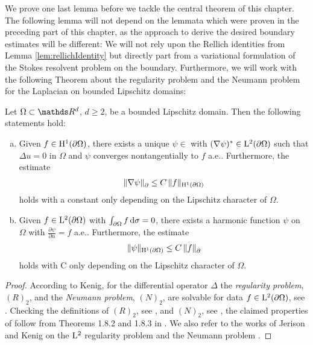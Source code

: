 We prove one last lemma before we tackle the central theorem of this chapter.
The following lemma will not depend on the lemmata which were proven in the preceding part of this chapter, as the approach to derive the desired boundary estimates will be different:
We will not rely upon the Rellich identities from Lemma \ref{lem:rellichIdentity} but directly part from a variational formulation of the Stokes resolvent problem on the boundary. 
Furthermore, we will work with the following Theorem about the regularity problem and the Neumann problem for the Laplacian on bounded Lipschitz domains:
\begin{thm}
  \label{thm:jerisonKenig}
  Let $\Omega \subset \R^d$, $d \geq 2$, be a bounded Lipschitz domain. Then the following statements hold:
  \begin{enumerate}[a)]
    \item Given $f \in \mathrm{H}^1(\partial\Omega)$, there exists a unique $\psi \in$ with $(\nabla \psi)^* \in \mathrm{L}^2(\partial\Omega)$ such that $\Delta u = 0$ in $\Omega$ and $\psi$ converges nontangentially to $f$ a.e.. Furthermore, the estimate 
      \begin{align*}
          \|\nabla\psi\|^{}_\partial \leq C\, \|f\|_{\mathrm{H}^1(\partial\Omega)}
      \end{align*}
      holds with a constant only depending on the Lipschitz character of $\Omega$.
    \item Given $f \in \mathrm{L}^2(\partial\Omega)$ with $\int_{\partial\Omega} f \, {\operatorname{d}\!{\sigma}} = 0$, there exists a harmonic function $\psi$ on $\Omega$ with $\frac{\partial\psi}{\partial n} = f$ a.e.. Furthermore, the estimate
      \begin{align*}
          \| \psi\|_{\mathrm{H}^1(\partial\Omega)} \leq C\, \|f\|^{}_\partial
      \end{align*}
      holds with C only depending on the Lipschitz character of $\Omega$.
  \end{enumerate}
\end{thm}

\begin{proof}
  According to Kenig, for the differential operator $\Delta$ the \emph{regularity problem}, $(R)_2$, and the \emph{Neumann problem}, $(N)_2$,  are solvable for data $f \in \mathrm{L}^2(\partial\Omega)$, see \cite[Thm.\@~2.1.10]{kenigBook}.
  Checking the definitions of $(R)_2$, see \cite[Defn.\@~1.7.10]{kenigBook}, and $(N)_2$, see \cite[Defn.\@~1.7.9]{kenigBook}, the claimed properties of follow from Theorems 1.8.2 and 1.8.3 in \cite[Chap.\@~1]{kenigBook}.
  We also refer to the works of Jerison and Kenig on the $\mathrm{L}^2$ regularity problem \cite{jerisonKenig2} and the Neumann problem \cite{jerisonKenig}.
\end{proof}

